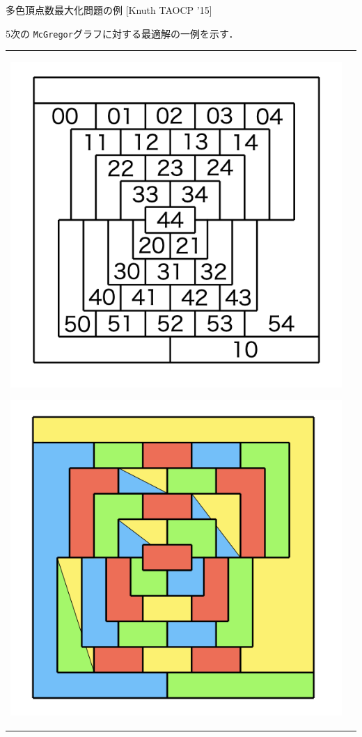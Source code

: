 \documentclass[dvipdfmx,11pt]{beamer}
\newcommand{\code}[1]{\lstinline[basicstyle=\ttfamily]{#1}}
\begin{document}
\begin{frame}{多色頂点数最大化問題の例 [Knuth TAOCP '15]}
  \begin{block}{}\centering
    5次の \code{McGregor}グラフに対する最適解の一例を示す．
  \end{block}

  \begin{tabular}{cc}
  \begin{minipage}[t]{0.5\linewidth}
   \centering
   \includegraphics[scale=0.2]{fig/order5.png}
  \end{minipage}
  \begin{minipage}[t]{0.5\linewidth}
   \centering
   \includegraphics[scale=0.2]{fig/order5_mult.png}
  \end{minipage}
 \end{tabular}


\end{frame}
\end{document}
